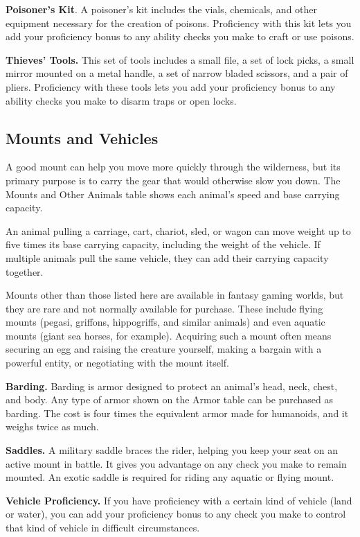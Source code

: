 \documentclass[
]{article}
\begin{document}
\textbf{Poisoner's Kit}. A poisoner's kit includes the vials, chemicals,
and other equipment necessary for the creation of poisons. Proficiency
with this kit lets you add your proficiency bonus to any ability checks
you make to craft or use poisons.

\textbf{Thieves' Tools.} This set of tools includes a small file, a set
of lock picks, a small mirror mounted on a metal handle, a set of narrow
bladed scissors, and a pair of pliers. Proficiency with these tools lets
you add your proficiency bonus to any ability checks you make to disarm
traps or open locks.

\hypertarget{mounts-and-vehicles}{%
\subsection{Mounts and Vehicles}\label{mounts-and-vehicles}}

A good mount can help you move more quickly through the wilderness, but
its primary purpose is to carry the gear that would otherwise slow you
down. The Mounts and Other Animals table shows each animal's speed and
base carrying capacity.

An animal pulling a carriage, cart, chariot, sled, or wagon can move
weight up to five times its base carrying capacity, including the weight
of the vehicle. If multiple animals pull the same vehicle, they can add
their carrying capacity together.

Mounts other than those listed here are available in fantasy gaming
worlds, but they are rare and not normally available for purchase. These
include flying mounts (pegasi, griffons, hippogriffs, and similar
animals) and even aquatic mounts (giant sea horses, for example).
Acquiring such a mount often means securing an egg and raising the
creature yourself, making a bargain with a powerful entity, or
negotiating with the mount itself.

\textbf{Barding.} Barding is armor designed to protect an animal's head,
neck, chest, and body. Any type of armor shown on the Armor table can be
purchased as barding. The cost is four times the equivalent armor made
for humanoids, and it weighs twice as much.

\textbf{Saddles.} A military saddle braces the rider, helping you keep
your seat on an active mount in battle. It gives you advantage on any
check you make to remain mounted. An exotic saddle is required for
riding any aquatic or flying mount.

\textbf{Vehicle Proficiency.} If you have proficiency with a certain
kind of vehicle (land or water), you can add your proficiency bonus to
any check you make to control that kind of vehicle in difficult
circumstances.
\end{document}
